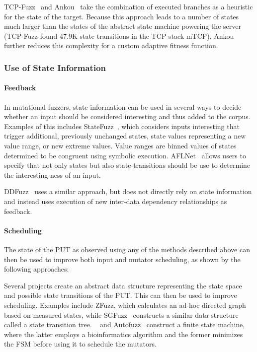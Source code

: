 \documentclass{article}
\let\savedCite=\cite
\renewcommand{\cite}{\unskip~\savedCite}
\begin{document}
\begin{multicols}{2}
  TCP-Fuzz\cite{TCPFuzz} and Ankou\cite{Ankou} take the combination of executed branches as a heuristic for the state of the target. Because this approach leads to a number of states much larger than the states of the abstract state machine powering the server (TCP-Fuzz found 47.9K state transitions in the TCP stack mTCP), Ankou further reduces this complexity for a custom adaptive fitness function.

  \subsubsection{Use of State Information}
  \paragraph{Feedback}

  In mutational fuzzers, state information can be used in several ways to decide whether an input should be considered interesting and thus added to the corpus. Examples of this includes StateFuzz\cite{StateFuzz}, which considers inputs interesting that trigger additional, previously unchanged states, state values representing a new value range, or new extreme values. Value ranges are binned values of states determined to be congruent using symbolic execution. AFLNet\cite{AFLNET} allows users to specify that not only states but also state-transitions should be use to determine the interesting-ness of an input.

  DDFuzz\cite{DDFuzz} uses a similar approach, but does not directly rely on state information and instead uses execution of new inter-data dependency relationships as feedback.

  \paragraph{Scheduling}

  The state of the PUT as observed using any of the methods described above can then be used to improve both input and mutator scheduling, as shown by the following approaches:

  Several projects create an abstract data structure representing the state space and possible state transitions of the PUT. This can then be used to improve scheduling. Examples include ZFuzz, which calculates an ad-hoc directed graph based on measured states, while SGFuzz\cite{SGFuzz} constructs a similar data structure called a state transition tree. \citeauthor{ModelBased}\cite{ModelBased} and Autofuzz\cite{Autofuzz} construct a finite state machine, where the latter employs a bioinformatics algorithm and the former minimizes the FSM before using it to schedule the mutators.


\end{multicols}
\end{document}
